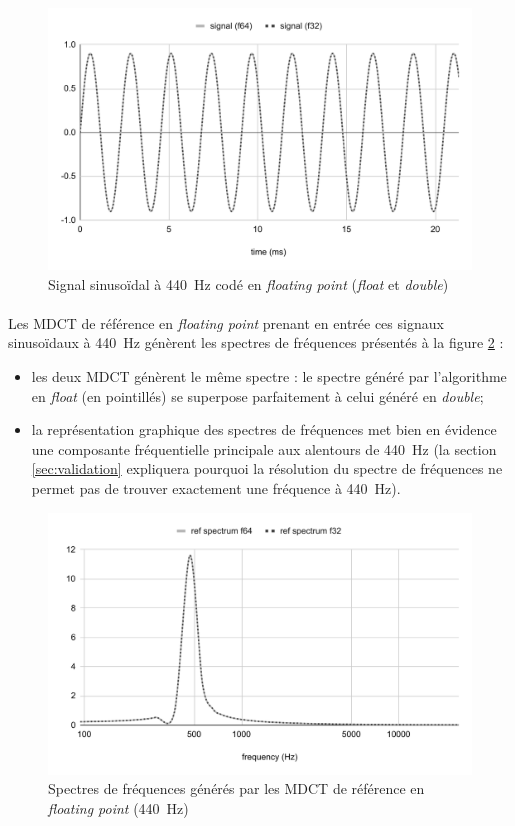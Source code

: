 \documentclass{article}
\begin{document}
    \begin{figure}[H]
        \centering
        \includegraphics[width=.8\linewidth]{./images/signal_f32_f64.pdf}
        \caption{Signal sinusoïdal à \SI{440}{\hertz} codé en \emph{floating point} (\emph{float} et \emph{double})}
        \label{fig:signal_f32_f64}
    \end{figure}

    \newpage
    \paragraph{}
    Les MDCT de référence en \emph{floating point} prenant en entrée ces signaux sinusoïdaux à \SI{440}{\hertz} génèrent les spectres de fréquences présentés à la figure \ref{fig:validation_ref_mdct_float} :
    \begin{itemize}
        \item les deux MDCT génèrent le même spectre : le spectre généré par l'algorithme en \emph{float} (en pointillés) se superpose parfaitement à celui généré en \emph{double};
        \item la représentation graphique des spectres de fréquences met bien en évidence une composante fréquentielle principale aux alentours de \SI{440}{\hertz} (la section \ref{sec:validation} expliquera pourquoi la résolution du spectre de fréquences ne permet pas de trouver exactement une fréquence à \SI{440}{\hertz}).
    \end{itemize}

    \begin{figure}[H]
        \centering
        \includegraphics[width=.8\linewidth]{./images/validation_ref_float.pdf}
        \caption{Spectres de fréquences générés par les MDCT de référence en \emph{floating point} (\SI{440}{\hertz})}
        \label{fig:validation_ref_mdct_float}
    \end{figure}
\end{document}
